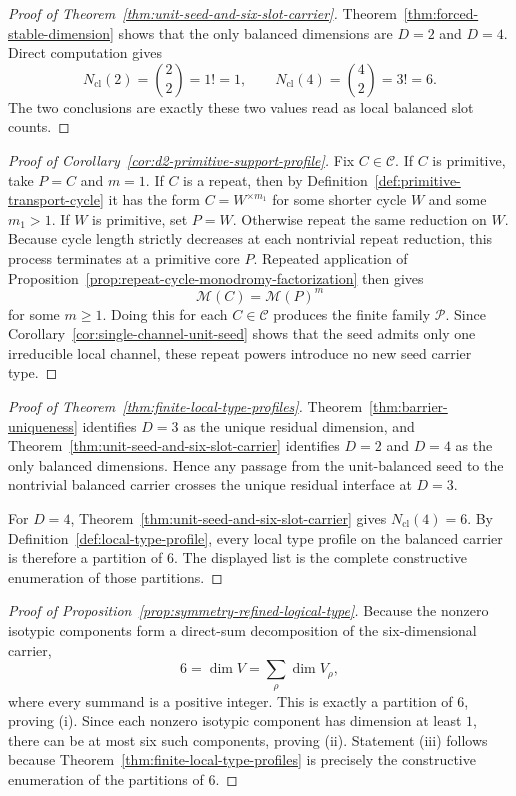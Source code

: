 \begin{proof}[Proof of Theorem~\ref{thm:unit-seed-and-six-slot-carrier}]
\label{proof:thm:unit-seed-and-six-slot-carrier}
Theorem~\ref{thm:forced-stable-dimension} shows that the only balanced
dimensions are $D=2$ and $D=4$. Direct computation gives
\[
N_{\mathrm{cl}}(2)=\binom{2}{2}=1!=1,
\qquad
N_{\mathrm{cl}}(4)=\binom{4}{2}=3!=6.
\]
The two conclusions are exactly these two values read as local balanced slot
counts.
\end{proof}

\begin{proof}[Proof of Corollary~\ref{cor:d2-primitive-support-profile}]
\label{proof:cor:d2-primitive-support-profile}
Fix \(C\in\mathcal C\). If \(C\) is primitive, take \(P=C\) and \(m=1\). If
\(C\) is a repeat, then by Definition~\ref{def:primitive-transport-cycle} it
has the form \(C=W^{\times m_1}\) for some shorter cycle \(W\) and some
\(m_1>1\). If \(W\) is primitive, set \(P=W\). Otherwise repeat the same
reduction on \(W\). Because cycle length strictly decreases at each nontrivial
repeat reduction, this process terminates at a primitive core \(P\). Repeated
application of Proposition~\ref{prop:repeat-cycle-monodromy-factorization}
then gives
\[
\mathcal M(C)=\mathcal M(P)^m
\]
for some \(m\ge 1\). Doing this for each \(C\in\mathcal C\) produces the
finite family \(\mathcal P\). Since
Corollary~\ref{cor:single-channel-unit-seed} shows that the seed admits only
one irreducible local channel, these repeat powers introduce no new seed
carrier type.
\end{proof}

\begin{proof}[Proof of Theorem~\ref{thm:finite-local-type-profiles}]
\label{proof:thm:finite-local-type-profiles}
Theorem~\ref{thm:barrier-uniqueness} identifies $D=3$ as the unique residual
dimension, and Theorem~\ref{thm:unit-seed-and-six-slot-carrier} identifies
$D=2$ and $D=4$ as the only balanced dimensions. Hence any passage from the
unit-balanced seed to the nontrivial balanced carrier crosses the unique
residual interface at $D=3$.

For $D=4$, Theorem~\ref{thm:unit-seed-and-six-slot-carrier} gives
$N_{\mathrm{cl}}(4)=6$. By Definition~\ref{def:local-type-profile}, every
local type profile on the balanced carrier is therefore a partition of $6$.
The displayed list is the complete constructive enumeration of those
partitions.
\end{proof}

\begin{proof}[Proof of Proposition~\ref{prop:symmetry-refined-logical-type}]
\label{proof:prop:symmetry-refined-logical-type}
Because the nonzero isotypic components form a direct-sum decomposition of the
six-dimensional carrier,
\[
6=\dim V=\sum_{\rho}\dim V_\rho,
\]
where every summand is a positive integer. This is exactly a partition of $6$,
proving (i). Since each nonzero isotypic component has dimension at least $1$,
there can be at most six such components, proving (ii). Statement (iii)
follows because Theorem~\ref{thm:finite-local-type-profiles} is precisely the
constructive enumeration of the partitions of $6$.
\end{proof}

